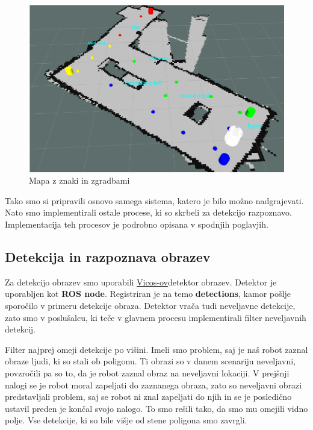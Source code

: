\documentclass[a4paper,11pt]{article}
\begin{document}
\begin{figure}[h]
\begin{center}
\includegraphics[width=\textwidth]{mapAll.png}
\caption{Mapa z znaki in zgradbami}
\label{slika1}
\end{center}
\end{figure}

Tako smo si pripravili osnovo samega sistema, katero je bilo možno nadgrajevati. Nato smo implementirali ostale procese, ki so skrbeli za detekcijo razpoznavo. Implementacija teh procesov je podrobno opisana v spodnjih poglavjih.

\subsection{Detekcija in razpoznava obrazev}

Za detekcijo obrazev smo uporabili \href{https://github.com/vicoslab/vicos_ros}{Vicos-ov}detektor obrazev. Detektor je uporabljen kot \textbf{ROS node}. Registriran je na temo \textbf{detections}, kamor pošlje sporočilo v primeru detekcije obraza. Detektor vrača tudi neveljavne detekcije, zato smo v poslušalcu, ki teče v glavnem procesu implementirali filter neveljavnih detekcij.

Filter najprej omeji detekcije po višini. Imeli smo problem, saj je naš robot zaznal obraze ljudi, ki so stali ob poligonu. Ti obrazi so v danem scenariju neveljavni, povzročili pa so to, da je robot zaznal obraz na neveljavni lokaciji. V prejšnji nalogi se je robot moral zapeljati do zaznanega obraza, zato so neveljavni obrazi predstavljali problem, saj se robot ni znal zapeljati do njih in se je posledično ustavil preden je končal svojo nalogo. To smo rešili tako, da smo mu omejili vidno polje. Vse detekcije, ki so bile višje od stene poligona smo zavrgli. 
\end{document}
